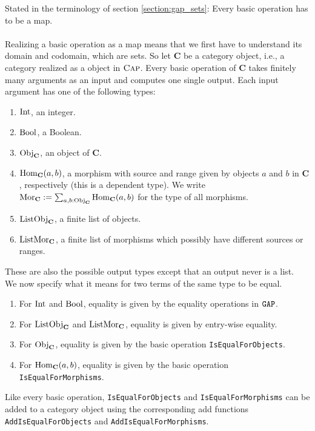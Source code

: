 Stated in the terminology of section \ref{section:gap_sets}: Every basic operation has to be a \GAP map.
\\ \\
Realizing a basic operation as a \GAP map means that we first have to understand its domain and codomain,
which are \GAP sets.
So let $\mathbf{C}$ be a category object, i.e., a category realized as a \GAP object in $\textsc{Cap}$.
Every basic operation of $\mathbf{C}$ takes finitely many arguments as an input and computes one single output.
Each input argument has one of the following types:
\begin{enumerate}
 \item $\mathrm{Int}$, an integer.
 \item $\mathrm{Bool}$, a Boolean.
 \item $\mathrm{Obj}_{\mathbf{C}}$, an object of $\mathbf{C}$.
 \item $\operatorname{\mathrm{Hom}}_{\mathbf{C}}( a, b )$, a morphism with source and range given by objects $a$ and $b$ in $\mathbf{C}$, respectively (this is a dependent type).
       We write $\mathrm{Mor}_{\mathbf{C}} := \sum_{a,b: \mathrm{Obj}_{\mathbf{C}}} \operatorname{\mathrm{Hom}}_{\mathbf{C}}( a, b )$ for the type of all morphisms.
 \item $\mathrm{ListObj}_{\mathbf{C}}$, a finite list of objects.
 \item $\mathrm{ListMor}_{\mathbf{C}}$, a finite list of morphisms which possibly have different sources or ranges.
\end{enumerate}
These are also the possible output types except that an output never is a list. \\
We now specify what it means for two terms of the same type to be equal.
\begin{enumerate}
 \item For $\mathrm{Int}$ and $\mathrm{Bool}$, equality is given by the equality operations in $\texttt{GAP}$.
 \item For $\mathrm{ListObj}_{\mathbf{C}}$ and $\mathrm{ListMor}_{\mathbf{C}}$, equality is given by entry-wise equality.
 \item For $\mathrm{Obj}_{\mathbf{C}}$, equality is given by the basic operation \texttt{IsEqualForObjects}.
 \item For $\operatorname{\mathrm{Hom}}_{\mathbf{C}}( a, b )$, equality is given by the basic operation \texttt{IsEqualForMorphisms}.
\end{enumerate}

Like every basic operation, \texttt{IsEqualForObjects} and \texttt{IsEqualForMorphisms} can be added to 
a category object using the corresponding add functions \texttt{AddIsEqualForObjects} and \texttt{AddIsEqualForMorphisms}.

